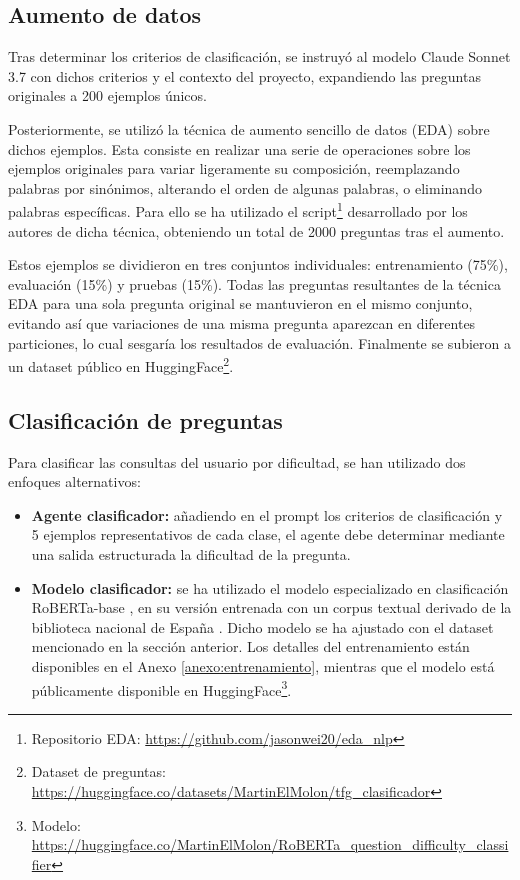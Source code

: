 \subsection{Aumento de datos}
Tras determinar los criterios de clasificación, se instruyó al modelo Claude Sonnet 3.7 con dichos criterios y el contexto del proyecto, expandiendo las preguntas originales a 200 ejemplos únicos.

Posteriormente, se utilizó la técnica de aumento sencillo de datos (EDA) \cite{wei_eda_2019} sobre dichos ejemplos. Esta consiste en realizar una serie de operaciones sobre los ejemplos originales para variar ligeramente su composición, reemplazando palabras por sinónimos, alterando el orden de algunas palabras, o eliminando palabras específicas. Para ello se ha utilizado el script\footnote{Repositorio EDA: \url{https://github.com/jasonwei20/eda_nlp}} desarrollado por los autores de dicha técnica, obteniendo un total de 2000 preguntas tras el aumento.

Estos ejemplos se dividieron en tres conjuntos individuales: entrenamiento (75\%), evaluación (15\%) y pruebas (15\%). Todas las preguntas resultantes de la técnica EDA para una sola pregunta original se mantuvieron en el mismo conjunto, evitando así que variaciones de una misma pregunta aparezcan en diferentes particiones, lo cual sesgaría los resultados de evaluación. Finalmente se subieron a un dataset público en HuggingFace\footnote{Dataset de preguntas: \url{https://huggingface.co/datasets/MartinElMolon/tfg_clasificador}}.

\subsection{Clasificación de preguntas}
Para clasificar las consultas del usuario por dificultad, se han utilizado dos enfoques alternativos:

\begin{itemize}
\item\textbf{Agente clasificador: }añadiendo en el prompt los criterios de clasificación y 5 ejemplos representativos de cada clase, el agente debe determinar mediante una salida estructurada la dificultad de la pregunta.
\item\textbf{Modelo clasificador: }se ha utilizado el modelo especializado en clasificación RoBERTa-base \cite{liu_roberta_2019}, en su versión entrenada con un corpus textual derivado de la biblioteca nacional de España \cite{gutierrez-fandino_maria_2022}. Dicho modelo se ha ajustado con el dataset mencionado en la sección anterior. Los detalles del entrenamiento están disponibles en el Anexo \ref{anexo:entrenamiento}, mientras que el modelo está públicamente disponible en HuggingFace\footnote{Modelo: \url{https://huggingface.co/MartinElMolon/RoBERTa_question_difficulty_classifier}}.


\end{itemize}

